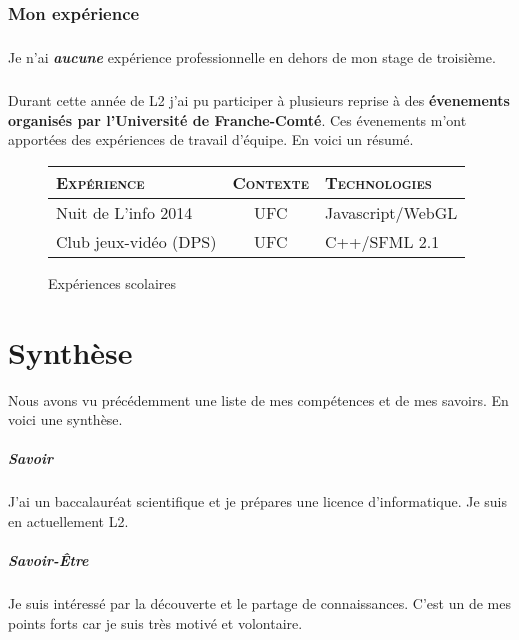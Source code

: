 \documentclass[a4paper,12pt, draft]{report}
\newcommand{\tabTitle}[1]{\hfill{} \textsc{#1} \hfill{} }
\begin{document}
\subsection{Mon expérience}
\paragraph{}
Je n'ai \textit{\textbf{aucune}} expérience professionnelle en dehors de mon stage de troisième.

\paragraph{}
Durant cette année de L2 j'ai pu participer à plusieurs reprise à des \textbf{évenements organisés par l'Université de Franche-Comté}. Ces évenements m'ont apportées des expériences de travail d'équipe. En voici un résumé.

\begin{figure}[h]
\begin{tabular}{|l|c|l|}
\hline
\tabTitle{Expérience}  &  \tabTitle{Contexte} & \tabTitle{Technologies}\\
\hline
Nuit de L'info 2014  & UFC & Javascript/WebGL\\
\hline
Club jeux-vidéo (DPS\footnotemark{})  & UFC & C++/SFML 2.1\\
\hline
\end{tabular}
\caption{Expériences scolaires}
\end{figure}

\chapter{Synthèse} \label{RefSyntheseBilanPerso}
Nous avons vu précédemment une liste de mes compétences et de mes savoirs.
En voici une synthèse.

\paragraph{Savoir}
J'ai un baccalauréat scientifique et je prépares une licence d'informatique.
Je suis en actuellement L2.

\paragraph{Savoir-Être}
Je suis intéressé par la découverte et le partage de connaissances. C'est un de mes points forts car je suis très motivé et volontaire.
\end{document}
